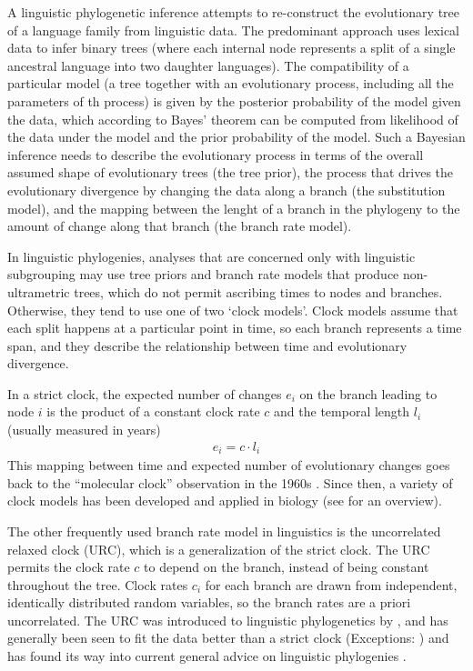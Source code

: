 \documentclass[]{rsos}%
\begin{document}
A linguistic phylogenetic inference attempts to re-construct the evolutionary
tree of a language family from linguistic data. The predominant approach uses
lexical data to infer binary trees (where each internal node represents a split
of a single ancestral language into two daughter languages). The compatibility
of a particular model (a tree together with an evolutionary process, including
all the parameters of th process) is given by the posterior probability of the
model given the data, which according to Bayes' theorem can be computed from
likelihood of the data under the model and the prior probability of the model.
Such a Bayesian inference needs to describe the evolutionary process in terms of
the overall assumed shape of evolutionary trees (the tree prior), the process
that drives the evolutionary divergence by changing the data along a branch (the
substitution model), and the mapping between the lenght of a branch in the
phylogeny to the amount of change along that branch (the branch rate model).

In linguistic phylogenies, analyses that are concerned only with linguistic
subgrouping may use tree priors and branch rate models that produce
non-ultrametric trees, which do not permit ascribing times to nodes and
branches. Otherwise, they tend to use one of two ‘clock models’. Clock models
assume that each split happens at a particular point in time, so each branch
represents a time span, and they describe the relationship between time and
evolutionary divergence.

In a strict clock,
the expected number of changes $e_i$ on the branch leading to node $i$ is the product of a constant clock rate $c$ and the temporal length $l_i$ (usually measured in years)
\begin{align}
  e_i = c \cdot l_i
  \label{eq:strict}
\end{align}
This mapping between time and expected number of evolutionary changes goes back
to the “molecular clock” observation in the 1960s
\parencite{zuckerkandl1965evolutionary,kumar2005molecular}. Since then, a variety of clock models
has been developed and applied in biology (see \textcite{ho2014molecularclock} for an
overview).

The other frequently used branch rate model in linguistics is the uncorrelated relaxed
clock (URC), which is a generalization of the strict clock.
The URC \parencite{drummond2006relaxed} permits the clock rate $c$ to depend on
the branch, instead of being constant throughout the tree. Clock
rates $c_i$ for each branch are drawn from independent, identically distributed random
variables, so the branch rates are a priori uncorrelated.
The URC was introduced to linguistic
phylogenetics by \textcite{kitchen2009bayesian}, and has generally been seen to
fit the data better than a strict clock
\parencite{bouckaert2012mapping,honkola2013cultural,lee2013evolution}
(Exceptions: \cite{savelyev2020bayesian,kaiping2021systematic})
and has found its way into current general advice on linguistic phylogenies
\parencite{maurits2017beastling,hoffmann2021bayesian}.
\end{document}
